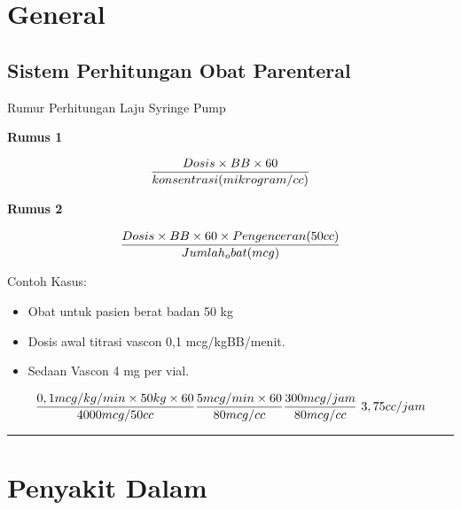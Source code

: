 \documentclass[
]{book}
\providecommand{\tightlist}{%
  \setlength{\itemsep}{0pt}\setlength{\parskip}{0pt}}
\begin{document}
\hypertarget{general-1}{%
\section{General}\label{general-1}}

\hypertarget{sistem-perhitungan-obat-parenteral}{%
\subsection{Sistem Perhitungan Obat Parenteral}\label{sistem-perhitungan-obat-parenteral}}

Rumur Perhitungan Laju Syringe Pump

\textbf{Rumus 1}

\begin{equation}
\\
\frac{Dosis \times BB \times 60}{konsentrasi (mikrogram/cc)}
\\
\end{equation}

\textbf{Rumus 2}

\begin{equation}
\\
\frac{Dosis \times BB \times 60 \times Pengenceran(50 cc)}{Jumlah_obat (mcg)}
\end{equation}

Contoh Kasus:

\begin{itemize}
\tightlist
\item
  Obat untuk pasien berat badan 50 kg
\item
  Dosis awal titrasi vascon 0,1 mcg/kgBB/menit.
\item
  Sedaan Vascon 4 mg per vial.
\end{itemize}

\begin{equation}
\frac{0,1 mcg/kg/min \times 50 kg \times 60}{4000 mcg/50cc}
\\
\frac{5 mcg/min \times 60}{80mcg/cc}
\\ 
\frac{300 mcg/jam}{80 mcg/cc}
\\ 
\ 3,75 cc/jam
\\
\end{equation}

\begin{center}\rule{0.5\linewidth}{0.5pt}\end{center}

\hypertarget{penyakit-dalam-2}{%
\section{Penyakit Dalam}\label{penyakit-dalam-2}}
\end{document}
